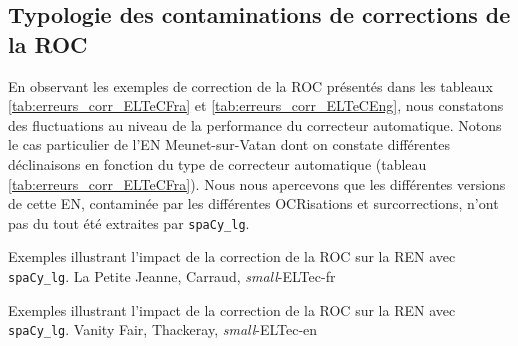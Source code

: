\subsection{Typologie des contaminations de corrections de la ROC}
\label{subsec:Typologie_COR-OCR-IMPACT-NER}

En observant les exemples de correction de la ROC présentés dans les tableaux \ref{tab:erreurs_corr_ELTeCFra} et \ref{tab:erreurs_corr_ELTeCEng}, nous constatons des fluctuations au niveau de la performance du correcteur automatique.
Notons le cas particulier de l'EN \og{}Meunet-sur-Vatan\fg{} dont on constate différentes déclinaisons en fonction du type de correcteur automatique (tableau \ref{tab:erreurs_corr_ELTeCFra}). Nous nous apercevons que les différentes versions de cette EN, contaminée par les différentes OCRisations et surcorrections, n'ont pas du tout été extraites par \texttt{spaCy\_lg}.

\begin{table}[h!]
\scriptsize
    \centering
   
     \caption{Exemples illustrant l'impact de la correction de la ROC sur la REN avec \texttt{spaCy\_lg}. {\normalfont La Petite Jeanne}, Carraud, \textit{small}-ELTec-fr}
    \label{tab:erreurs_corr_ELTeCFra}
\end{table}

\begin{table}[h!]
\scriptsize
    \centering
   
    \caption{Exemples illustrant l'impact de la correction de la ROC sur la REN avec \texttt{spaCy\_lg}. {\normalfont Vanity Fair}, Thackeray, \textit{small}-ELTec-en}
    \label{tab:erreurs_corr_ELTeCEng}
\end{table}

